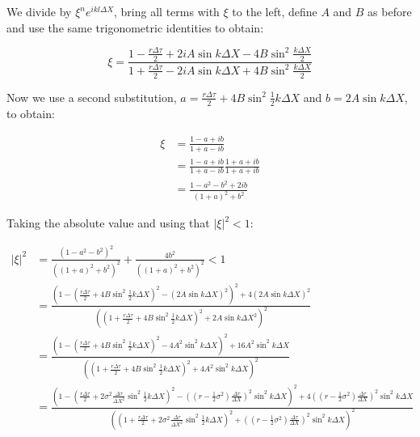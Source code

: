 \documentclass[11pt,a4paper]{article}
\begin{document}
We divide by $\xi^ne^{ikl\Delta X}$, bring all terms with $\xi$ to the left, define $A$ and $B$ as before and use the same trigonometric identities to obtain:

\begin{equation*}
  \xi = \frac{1 - \frac{r \Delta \tau}{2} + 2iA\sin{k\Delta X} - 4B\sin^2{\frac{k\Delta X}{2}}}{1 + \frac{r \Delta \tau}{2} - 2iA\sin{k\Delta X} + 4B\sin^2{\frac{k\Delta X}{2}}}
\end{equation*}

Now we use a second substitution, $a = \frac{r \Delta \tau}{2} + 4B\sin^2{\frac{1}{2}k\Delta X}$ and $b = 2A\sin{k\Delta X}$, to obtain:

\begin{align*}
  \xi &= \frac{1 - a + ib}{1 + a - ib} \\
  &= \frac{1 - a + ib}{1 + a -ib} \frac{1 + a + ib}{1 + a + ib} \\
  &= \frac{1 - a^2 - b^2 + 2ib}{(1+a)^2 + b^2}
\end{align*}

Taking the absolute value and using that $|\xi|^2 < 1$:

\begin{align}
  |\xi|^2 &=  \frac{\left(1 - a^2 - b^2\right)^2}{\left(\left(1+a\right)^2 + b^2\right)^2} + \frac{4b^2}{\left(\left(1+a\right)^2 + b^2\right)^2} < 1 \label{eq:CN}\\
  &= \frac{\left(1 - \left(\frac{r \Delta \tau}{2} + 4B\sin^2{\frac{1}{2}k\Delta X}\right)^2 - \left(2A\sin{k\Delta X}\right)^2\right)^2 + 4\left(2A\sin{k\Delta X}\right)^2}{\left(\left(1+\frac{r \Delta \tau}{2} + 4B\sin^2{\frac{1}{2}k\Delta X}\right)^2 + 2A\sin{k\Delta X}^2\right)^2} \nonumber \\
  &= \frac{\left(1 - \left(\frac{r \Delta \tau}{2} + 4B\sin^2{\frac{1}{2}k\Delta X}\right)^2 - 4A^2\sin^2{k\Delta X}\right)^2 + 16A^2\sin^2{k\Delta X}}{\left(\left(1+\frac{r \Delta \tau}{2} + 4B\sin^2{\frac{1}{2}k\Delta X}\right)^2 + 4A^2\sin^2{k\Delta X}\right)^2} \nonumber \\
  &= \frac{\left(1 - \left(\frac{r \Delta \tau}{2} + 2\sigma^2\frac{\Delta \tau}{\Delta X^2}\sin^2{\frac{1}{2}k\Delta X}\right)^2 - \left(\left(r-\frac{1}{2}\sigma^2\right)\frac{\Delta \tau}{\Delta X}\right)^2\sin^2{k\Delta X}\right)^2 + 4\left(\left(r-\frac{1}{2}\sigma^2\right)\frac{\Delta \tau}{\Delta X}\right)^2\sin^2{k\Delta X}}{\left(\left(1+\frac{r \Delta \tau}{2} + 2\sigma^2\frac{\Delta \tau}{\Delta X^2}\sin^2{\frac{1}{2}k\Delta X}\right)^2 + \left(\left(r-\frac{1}{2}\sigma^2\right)\frac{\Delta \tau}{\Delta X}\right)^2\sin^2{k\Delta X}\right)^2} \nonumber
\end{align}
\end{document}
